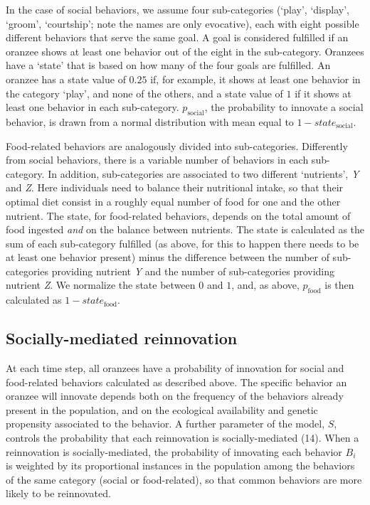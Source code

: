 \documentclass[9pt,twocolumn,twoside,]{pnas-new}
\begin{document}
In the case of social behaviors, we assume four sub-categories (`play',
`display', `groom', `courtship'; note the names are only evocative),
each with eight possible different behaviors that serve the same goal. A
goal is considered fulfilled if an oranzee shows at least one behavior
out of the eight in the sub-category. Oranzees have a `state' that is
based on how many of the four goals are fulfilled. An oranzee has a
state value of \(0.25\) if, for example, it shows at least one behavior
in the category `play', and none of the others, and a state value of
\(1\) if it shows at least one behavior in each sub-category.
\(p_\text{social}\), the probability to innovate a social behavior, is
drawn from a normal distribution with mean equal to
\(1-state_\text{social}\).

Food-related behaviors are analogously divided into sub-categories.
Differently from social behaviors, there is a variable number of
behaviors in each sub-category. In addition, sub-categories are
associated to two different `nutrients', \emph{Y} and \emph{Z}. Here
individuals need to balance their nutritional intake, so that their
optimal diet consist in a roughly equal number of food for one and the
other nutrient. The state, for food-related behaviors, depends on the
total amount of food ingested \emph{and} on the balance between
nutrients. The state is calculated as the sum of each sub-category
fulfilled (as above, for this to happen there needs to be at least one
behavior present) minus the difference between the number of
sub-categories providing nutrient \emph{Y} and the number of
sub-categories providing nutrient \emph{Z}. We normalize the state
between \(0\) and \(1\), and, as above, \(p_\text{food}\) is then
calculated as \(1-state_\text{food}\).

\subsection*{Socially-mediated reinnovation}\label{format}

At each time step, all oranzees have a probability of innovation for
social and food-related behaviors calculated as described above. The
specific behavior an oranzee will innovate depends both on the frequency
of the behaviors already present in the population, and on the
ecological availability and genetic propensity associated to the
behavior. A further parameter of the model, \(S\), controls the
probability that each reinnovation is socially-mediated (14). When a
reinnovation is socially-mediated, the probability of innovating each
behavior \(B_i\) is weighted by its proportional instances in the
population among the behaviors of the same category (social or
food-related), so that common behaviors are more likely to be
reinnovated.
\end{document}
